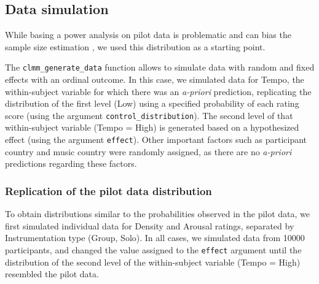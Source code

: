 \documentclass[
  bookmarksnumbered]{article}
\begin{document}
\hypertarget{data-simulation}{%
\subsection{Data simulation}\label{data-simulation}}

While basing a power analysis on pilot data is problematic and can bias the sample size estimation \autocite[see e.g.,][]{albersWhenPowerAnalyses2018}, we used this distribution as a starting point.

The \texttt{clmm\_generate\_data} function \autocite{bordersPowerAnalysisOrdinal2022} allows to simulate data with random and fixed effects with an ordinal outcome. In this case, we simulated data for Tempo, the within-subject variable for which there was an \emph{a-priori} prediction, replicating the distribution of the first level (Low) using a specified probability of each rating score (using the argument \texttt{control\_distribution}). The second level of that within-subject variable (Tempo = High) is generated based on a hypothesized effect (using the argument \texttt{effect}). Other important factors such as participant country and music country were randomly assigned, as there are no \emph{a-priori} predictions regarding these factors.

\hypertarget{replication-of-the-pilot-data-distribution}{%
\subsubsection{Replication of the pilot data distribution}\label{replication-of-the-pilot-data-distribution}}

To obtain distributions similar to the probabilities observed in the pilot data, we first simulated individual data for Density and Arousal ratings, separated by Instrumentation type (Group, Solo). In all cases, we simulated data from 10000 participants, and changed the value assigned to the \texttt{effect} argument until the distribution of the second level of the within-subject variable (Tempo = High) resembled the pilot data.
\end{document}
